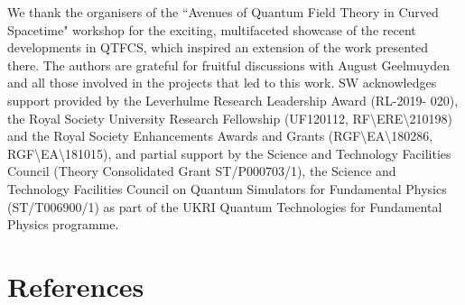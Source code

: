 \documentclass[a4paper]{jpconf}
\begin{document}
\ack
We thank the organisers of the ``Avenues of Quantum Field Theory in Curved Spacetime" workshop for the exciting, multifaceted showcase of the recent developments in QTFCS, which inspired an extension of the work presented there. 
The authors are grateful for fruitful discussions with August Geelmuyden and all those involved in the projects that led to this work. 
SW acknowledges support provided by the Leverhulme Research Leadership Award (RL-2019- 020),
the Royal Society University Research Fellowship
(UF120112, RF\textbackslash ERE\textbackslash 210198) and the Royal Society Enhancements Awards and Grants
(RGF\textbackslash EA\textbackslash 180286, RGF\textbackslash EA\textbackslash 181015), and partial
support by the Science and Technology Facilities Council (Theory Consolidated Grant ST/P000703/1), the Science and Technology Facilities Council on Quantum Simulators for Fundamental Physics (ST/T006900/1) as part
of the UKRI Quantum Technologies for Fundamental
Physics programme.

\section*{References}

\appendix 
\end{document}
